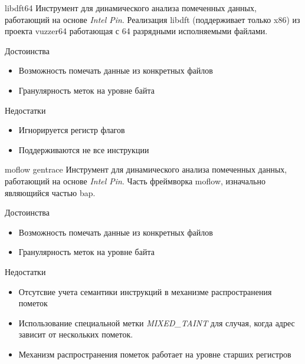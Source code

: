 \documentclass[10pt]{beamer}
\begin{document}
\begin{frame}{libdft64}
    Инструмент для динамического анализа помеченных данных, работающий на основе \emph{Intel Pin}. Реализация libdft (поддерживает только x86) из проекта vuzzer64 работающая с 64 разрядными исполняемыми файлами. 
    \begin{block}{Достоинства}
      \begin{itemize}
        \item Возможность помечать данные из конкретных файлов
        \item Гранулярность меток на уровне байта
      \end{itemize}
    \end{block}
        \begin{block}{Недостатки}
          \begin{itemize}
      \item Игнорируется регистр флагов
      \item Поддерживаются не все инструкции
      \end{itemize}
    \end{block}
\end{frame}


\begin{frame}{moflow gentrace}
    Инструмент для динамического анализа помеченных данных, работающий на основе \emph{Intel Pin}.
    Часть фреймворка moflow, изначально являющийся частью bap.
    \begin{block}{Достоинства}
      \begin{itemize}
        \item Возможность помечать данные из конкретных файлов
        \item Гранулярность меток на уровне байта
      \end{itemize}
    \end{block}
        \begin{block}{Недостатки}
          \begin{itemize}
      \item Отсутсвие учета семантики инструкций в механизме распространения пометок
      \item Использование специальной метки \emph{MIXED\_TAINT} для случая, когда адрес зависит от нескольких пометок.
      \item Механизм распространения пометок работает на уровне старших регистров
      \end{itemize}
    \end{block}
\end{frame}
\end{document}
